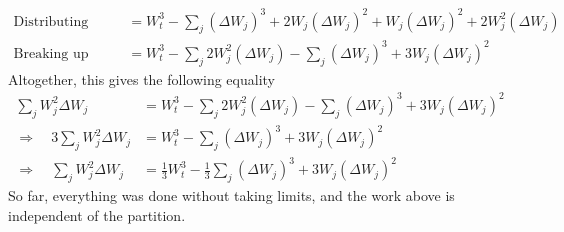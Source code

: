 \documentclass[12pt]{article}
\theoremstyle{plain}
\theoremstyle{definition}
\theoremstyle{remark}
\begin{document}
\begin{enumerate}
\begin{enumerate}
\begin{align*}
        \text{Distributing} \qquad
        &= W^3_t
          - \sum_j
            (\Delta W_{j})^3
            + 2 W_j (\Delta W_j)^2
            + W_j(\Delta W_j)^2
            + 2 W_j^2 (\Delta W_j)\\
        \text{Breaking up} \qquad
        &= W^3_t
          - \sum_j 2 W_j^2 (\Delta W_j)
          - \sum_j
            (\Delta W_{j})^3
            + 3 W_j (\Delta W_j)^2
      \end{align*}
      Altogether, this gives the following equality
      \begin{align*}
        \sum_j W_j^2 \Delta W_j
        &= W^3_t
          - \sum_j 2 W_j^2 (\Delta W_j)
          - \sum_j
            (\Delta W_{j})^3
            + 3 W_j (\Delta W_j)^2 \\
        \Rightarrow\quad
        3\sum_j W_j^2 \Delta W_j
        &= W^3_t
          - \sum_j
            (\Delta W_{j})^3
            + 3 W_j (\Delta W_j)^2 \\
        \Rightarrow\quad
        \sum_j W_j^2 \Delta W_j
        &= \frac{1}{3}W^3_t
          - \frac{1}{3}\sum_j
            (\Delta W_{j})^3
            + 3 W_j (\Delta W_j)^2
      \end{align*}
      So far, everything was done without taking limits, and the work
      above is independent of the partition.


\end{enumerate}
\end{enumerate}
\end{document}
